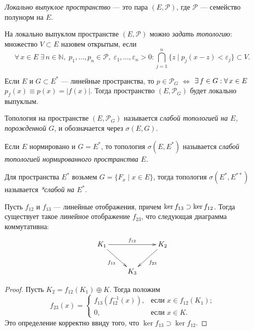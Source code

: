 \documentclass[12pt,titlepage, a4paper]{article}
\begin{document}

\begin{defen}
\emph{Локально выпуклое пространство} --- это пара
$(E,\mathcal{P})$, где $\mathcal{P}$ --- семейство полунорм на $E$.
\end{defen}

\begin{defen}
На локально выпуклом пространстве $(E,\mathcal{P})$ можно
\emph{задать топологию}: множество $V\subset E$ назовем открытым,
если $$\forall\,x\in E\;\exists\,n\in\mathbb{N},\;
p_1,\ldots,p_n\in\mathcal{P},\;\varepsilon_1,\ldots,\varepsilon_n>0:\bigcap\limits_{
j=1}^n\{z\mid p_j(x-z)<\varepsilon_j\}\subset V.$$
\end{defen}

Если $E$ и $G\subset E^*$ --- линейные пространства, то
$p\in\mathcal{P}_G$ $\Leftrightarrow$ $\exists\,f\p\in
G:\forall\,x\in E$\;\;$p_f(x)\equiv p(x)=|f(x)|$. Тогда пространство
$(E,\mathcal{P}_G)$ будет локально выпуклым.

\begin{defen}
Топология на пространстве $(E,\mathcal{P}_G)$ называется
\emph{слабой топологией на $E$, порожденной $G$}, и обозначается
через $\sigma(E,G)$.

Если $E$ нормировано и $G=E^*$, то топология $\sigma(E,E^*)$
называется \emph{слабой топологией нормированного пространства $E$}.

Для пространства $E^*$ возьмем $G=\{F_x\mid x\in E\}$, тогда
топология $\sigma(E^*, E^{**})$ называется \emph{*слабой на $E^*$}.
\end{defen}
\lecture

\begin{lemm}\label{lemm.algebra}
Пусть $f_{12}$ и $f_{13}$ --- линейные отображения, причем $\ker
f_{13}\p\supset \ker f_{12}$. Тогда существует такое линейное
отображение $f_{23}$, что следующая диаграмма коммутативна:
$$\xymatrix{
K_1 \ar@{->}[dr]_{f_{13}} \ar@{->}[rr]^{f_{12}}&& K_2\ar@{->}[dl]^{f_{23}}\\
&K_3}$$
\end{lemm}

\begin{proof}
Пусть $K_2=f_{12}(K_1)\oplus K$. Тогда положим
$$f_{23}(x)=
\begin{cases}
f_{13}(f_{12}^{-1}(x)),&\text{если $x\in f_{12}(K_1)$;}\\
0,&\text{если $x\in K.$}
\end{cases}$$
Это определение корректно ввиду того, что $\ker f_{13}\supset
\ker f_{12}$.
\end{proof}
\end{document}
